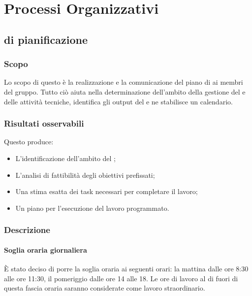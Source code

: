 \section{Processi Organizzativi}

\subsection{ di pianificazione}

\subsubsection{Scopo}

Lo scopo di questo  è la realizzazione e la comunicazione del piano di  ai membri del gruppo. Tutto ciò aiuta nella determinazione dell'ambito della gestione del  e delle attività tecniche, identifica gli output del  e ne stabilisce un calendario.


\subsubsection{Risultati osservabili}

Questo  produce:
\begin{itemize}

\item L'identificazione dell'ambito del ;
\item L'analisi di fattibilità degli obiettivi prefissati;
\item Una stima esatta dei task necessari per completare il lavoro;
\item Un piano per l'esecuzione del lavoro programmato.

\end{itemize}

\subsubsection{Descrizione}

\paragraph*{Soglia oraria giornaliera}È stato deciso di porre la soglia oraria ai seguenti orari: la mattina dalle ore 8:30 alle ore 11:30, il pomeriggio dalle ore 14 alle 18. Le ore di lavoro al di fuori di questa fascia oraria saranno considerate come lavoro straordinario.

